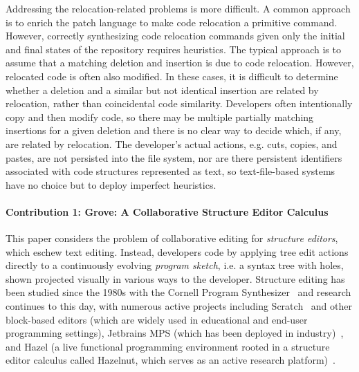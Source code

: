 Addressing the relocation-related problems is more difficult.
A common approach is to enrich the patch language to make code relocation a primitive command.
However, correctly synthesizing code relocation commands given only the initial and final states of the repository requires heuristics. 
The typical approach is to assume that a matching deletion and insertion is due to code relocation. However, relocated code is often also modified. 
In these cases, it is difficult to determine whether a deletion and a similar but not identical insertion are related by relocation, rather than coincidental code similarity. 
Developers often intentionally copy and then modify code, so there may be multiple partially matching insertions for a given deletion and there is no clear way to decide which, if any, are related by relocation. 
The developer's actual actions, e.g. cuts, copies, and pastes, are not persisted into the file system, nor are there persistent identifiers associated with code structures represented as text, so text-file-based systems have no choice but to deploy imperfect heuristics.

\paragraph{Contribution 1: Grove: A Collaborative Structure Editor Calculus} 
This paper considers the problem of collaborative editing for \emph{structure editors},
which eschew text editing. Instead, developers code by applying tree edit actions directly to a continuously evolving \emph{program sketch}, i.e. a syntax tree with holes, shown projected visually in various ways to the developer. 
Structure editing has been studied since the 1980s with the Cornell Program Synthesizer~\cite{DBLP:journals/cacm/TeitelbaumR81}
and research continues to this day, with numerous active projects including Scratch~\cite{maloney2010scratch} and other block-based editors (which are widely used in educational and end-user programming settings), Jetbrains MPS (which has been deployed in industry)~\cite{voelter2011language}, and Hazel (a live functional programming environment rooted in a structure editor calculus called Hazelnut, which serves as 
an active research platform)~\cite{DBLP:conf/popl/OmarVHAH17}. 


